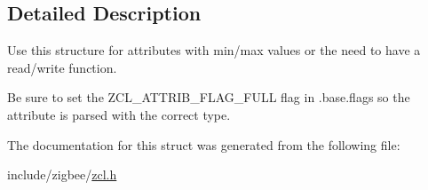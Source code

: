 \subsection{Detailed Description}
Use this structure for attributes with min/max values or the need to have a read/write function. 

Be sure to set the Z\-C\-L\-\_\-\-A\-T\-T\-R\-I\-B\-\_\-\-F\-L\-A\-G\-\_\-\-F\-U\-L\-L flag in .base.\-flags so the attribute is parsed with the correct type. 

The documentation for this struct was generated from the following file\-:\begin{DoxyCompactItemize}
\item 
include/zigbee/\hyperlink{zcl_8h}{zcl.\-h}\end{DoxyCompactItemize}
